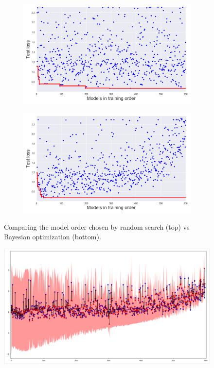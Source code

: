 \begin{figure}[htbp]
	\begin{subfigure}[b]{\textwidth}
            \centering
            \includegraphics[width=\linewidth]{img_hyperopt/cifar_random}
    \end{subfigure}%
    
    \begin{subfigure}[b]{\textwidth}
            \centering
            \includegraphics[width=\linewidth]{img_hyperopt/cifar_bo}
    \end{subfigure}%
    \caption{Comparing the model order chosen by random search (top) vs Bayesian optimization (bottom).}
	\label{fig:cifar_loss}
\end{figure}

\begin{figure}[htb]
	\centering
	\includegraphics[width=\linewidth]{img_hyperopt/bo_error_time.png}
	\label{fig:bo_error_time}
\end{figure}

